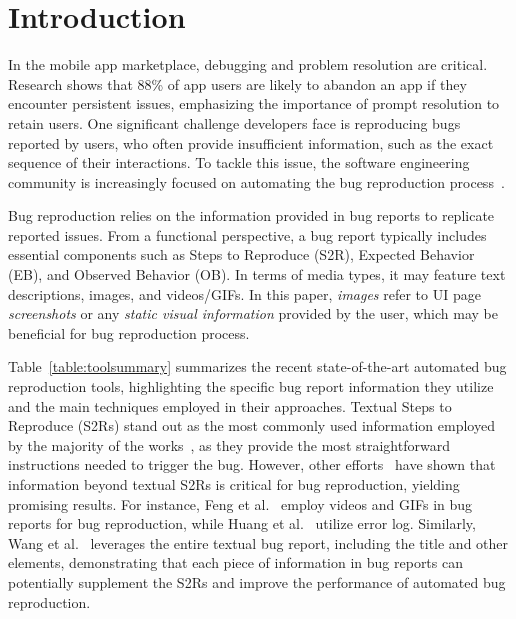 \section{Introduction}
\label{sec:intro}


In the mobile app marketplace, debugging and problem resolution are critical. Research shows that 88\% of app users are likely to abandon an app if they encounter persistent issues, emphasizing the importance of prompt resolution to retain users\cite{applause}. One significant challenge developers face is reproducing bugs reported by users, who often provide insufficient information, such as the exact sequence of their interactions\cite{johnson2022empirical, moran2015auto, bettenburg2008makes, ambriola1997processing}. To tackle this issue, the software engineering community is increasingly focused on automating the bug reproduction process~\cite{fazzini2018automatically, zhao2019recdroid, zhang2024mobile, zhang2023automatically, feng2024prompting, wang2024feedback, huang2023context, huang2024crashtranslator, feng2022gifdroid}.



Bug reproduction relies on the information provided in bug reports to replicate reported issues. 
%
From a functional perspective, a bug report typically includes essential components such as Steps to Reproduce (S2R), Expected Behavior (EB), and Observed Behavior (OB).  
%
In terms of media types, it may feature text descriptions, images, and videos/GIFs. 
%
In this paper, \textit{images} refer to UI page \emph{screenshots} or any \emph{static visual information} provided by the user, which may be beneficial for bug reproduction process.

Table~\ref{table:toolsummary} summarizes the recent state-of-the-art automated bug reproduction tools, highlighting the specific bug report information they utilize and the main techniques employed in their approaches. 
Textual Steps to Reproduce (S2Rs) stand out as the most commonly used information employed by the majority of the works~\cite{fazzini2018automatically, zhao2019recdroid, zhang2024mobile, zhang2023automatically, feng2024prompting}, as they provide the most straightforward instructions needed to trigger the bug. However, other efforts~\cite{wang2024feedback, feng2022gifdroid, huang2024crashtranslator} have shown that information beyond textual S2Rs is critical for bug reproduction, yielding promising results. For instance, Feng et al.~\cite{feng2022gifdroid,feng2023read,feng2022gifdroid1} employ videos and GIFs in bug reports for bug reproduction, while Huang et al.~\cite{huang2024crashtranslator} utilize error log. Similarly, Wang et al.~\cite{huang2023context} leverages the entire textual bug report, including the title and other elements, demonstrating that each piece of information in bug reports can potentially supplement the S2Rs and improve the performance of automated bug reproduction.

